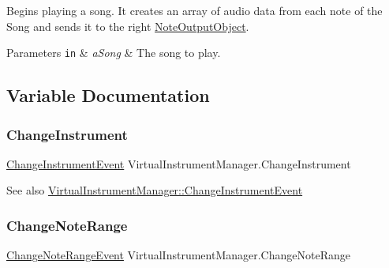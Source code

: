 Begins playing a song. It creates an array of audio data from each note of the Song and sends it to the right \hyperlink{class_note_output_object}{Note\+Output\+Object}. 


\begin{DoxyParams}[1]{Parameters}
\mbox{\tt in}  & {\em a\+Song} & The song to play. \\
\hline
\end{DoxyParams}


\subsection{Variable Documentation}
\mbox{\label{group___virtual_instrument_manager_event_types_ga1b9f12a73a5418ea5695d38b78c506c4}} 
\subsubsection{\texorpdfstring{Change\+Instrument}{ChangeInstrument}}
{\footnotesize\ttfamily \hyperlink{class_virtual_instrument_manager_1_1_change_instrument_event}{Change\+Instrument\+Event} Virtual\+Instrument\+Manager.\+Change\+Instrument}

\begin{DoxySeeAlso}{See also}
\hyperlink{class_virtual_instrument_manager_1_1_change_instrument_event}{Virtual\+Instrument\+Manager\+::\+Change\+Instrument\+Event} 
\end{DoxySeeAlso}
\mbox{\label{group___virtual_instrument_manager_event_types_gab6fa99d08e8466406835b9fc4ff859f1}} 
\subsubsection{\texorpdfstring{Change\+Note\+Range}{ChangeNoteRange}}
{\footnotesize\ttfamily \hyperlink{class_virtual_instrument_manager_1_1_change_note_range_event}{Change\+Note\+Range\+Event} Virtual\+Instrument\+Manager.\+Change\+Note\+Range}

